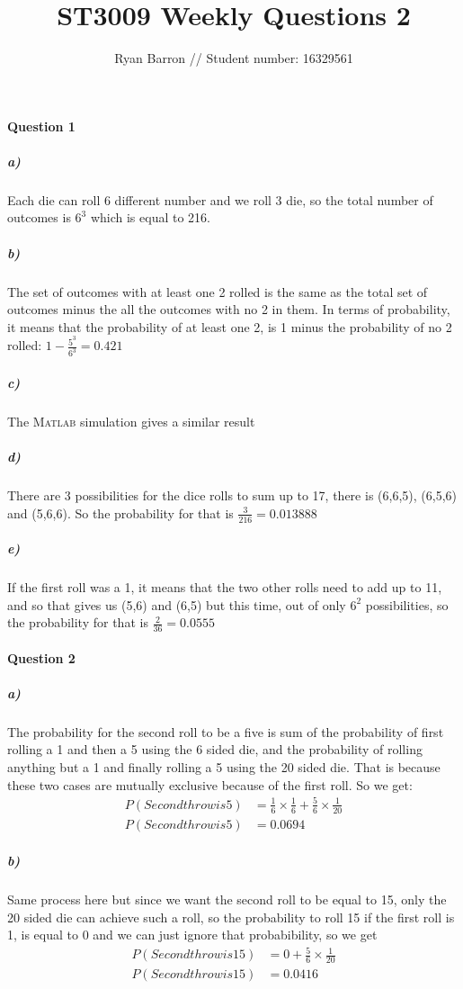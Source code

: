 \documentclass{article}
\title{ST3009 Weekly Questions 2}
\author{Ryan Barron // Student number: 16329561}
\begin{document}
\maketitle

\paragraph{Question 1}
\subparagraph{a)}   
Each die can roll 6 different number and we roll 3 die, so the total number of outcomes is $6^3$ which is equal to 216.
\subparagraph{b)}
The set of outcomes with at least one 2 rolled is the same as the total set of outcomes minus the all the outcomes with no 2 in them. In terms of probability, it means that the probability of at least one 2, is 1 minus the probability of no 2 rolled: $1 - \frac{5^3}{6^3}=0.421$
\subparagraph{c)}
The \textsc{Matlab} simulation gives a similar result
\subparagraph{d)}
There are 3 possibilities for the dice rolls to sum up to 17, there is (6,6,5), (6,5,6) and (5,6,6). So the probability for that is $\frac{3}{216} = 0.013888$
\subparagraph{e)}
If the first roll was a 1, it means that the two other rolls need to add up to 11, and so that gives us (5,6) and (6,5) but this time, out of only $6^2$ possibilities, so the probability for that is $\frac{2}{36} = 0.0555$
\paragraph{Question 2}
\subparagraph{a)}
The probability for the second roll to be a five is sum of the probability of first rolling a 1 and then a 5 using the 6 sided die, and the probability of rolling anything but a 1 and finally rolling a 5 using the 20 sided die. That is because these two cases are mutually exclusive because of the first roll. So we get:
\begin{equation*}
\begin{split}
P(Second throw is 5) & = \frac{1}{6}\times\frac{1}{6}+\frac{5}{6}\times\frac{1}{20} \\ 
P(Second throw is 5) & = 0.0694	
\end{split}
\end{equation*}
\subparagraph{b)}
Same process here but since we want the second roll to be equal to 15, only the 20 sided die can achieve such a roll, so the probability to roll 15 if the first roll is 1, is equal to 0 and we can just ignore that probabibility, so we get
\begin{equation*}
\begin{split}
P(Second throw is 15) & = 0 +\frac{5}{6}\times\frac{1}{20} \\ 
P(Second throw is 15) & = 0.0416	
\end{split}
\end{equation*}
\end{document}
